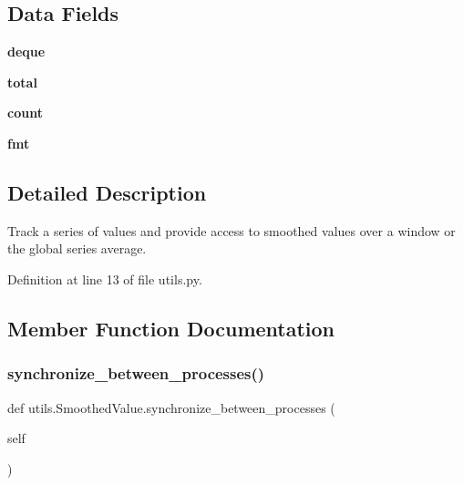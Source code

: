 \subsection*{Data Fields}
\begin{DoxyCompactItemize}
\item 
\mbox{\label{classutils_1_1SmoothedValue_a2b50643fd4bec01b5e3fa042143c54db}} 
{\bfseries deque}
\item 
\mbox{\label{classutils_1_1SmoothedValue_a986e369e5c0990fc2bceb0225b1db327}} 
{\bfseries total}
\item 
\mbox{\label{classutils_1_1SmoothedValue_a06d1c06cb8e10151e6347c0a672f96bc}} 
{\bfseries count}
\item 
\mbox{\label{classutils_1_1SmoothedValue_ac0a01b203431f6f586e758ba269476e4}} 
{\bfseries fmt}
\end{DoxyCompactItemize}


\subsection{Detailed Description}
\begin{DoxyVerb}Track a series of values and provide access to smoothed values over a
window or the global series average.
\end{DoxyVerb}
 

Definition at line 13 of file utils.\+py.



\subsection{Member Function Documentation}
\mbox{\label{classutils_1_1SmoothedValue_a8d10c867abf46adb6b0be5b6adcf1236}} 
\subsubsection{\texorpdfstring{synchronize\+\_\+between\+\_\+processes()}{synchronize\_between\_processes()}\hspace{0.1cm}{\footnotesize\ttfamily [1/5]}}
{\footnotesize\ttfamily def utils.\+Smoothed\+Value.\+synchronize\+\_\+between\+\_\+processes (\begin{DoxyParamCaption}\item[{}]{self }\end{DoxyParamCaption})}

